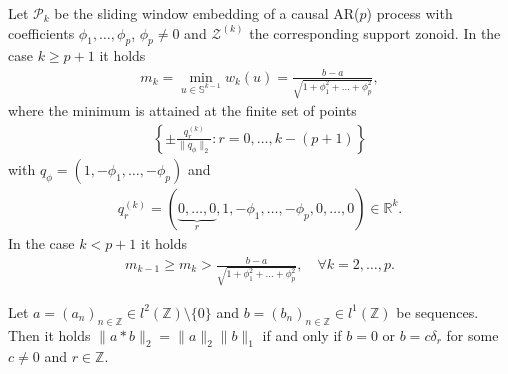 \begin{Prop}\label{prop:minimum_width}
    Let $\mathcal{P}_k$ be the sliding window embedding of a causal AR($p$) process with coefficients $\phi_1,\dots,\phi_p$, $\phi_p\ne0$ and $\mathcal{Z}^{(k)}$ the corresponding support zonoid. In the case $k\ge p+1$ it holds
    \begin{align*}
        m_k=\min_{u\in\mathbb{S}^{k-1}}w_k(u)=\frac{b-a}{\sqrt{1+\phi_1^2+\dots+\phi_p^2}},
    \end{align*}
    where the minimum is attained at the finite set of points
    \begin{align}\label{eq:minimizers}
        \left\{\pm\frac{q_r^{(k)}}{\|q_{\phi}\|_2}:r=0,\dots,k-(p+1)\right\}
    \end{align}
    with $q_{\phi}=(1,-\phi_1,\dots,-\phi_p)$ and
    \begin{align*}
        q_r^{(k)}=(\underbrace{0,\dots,0}_{r},1,-\phi_1,\dots,-\phi_p,0,\dots,0)\in\mathbb{R}^{k}.
    \end{align*}
    In the case $k<p+1$ it holds
    \begin{align*}
        m_{k-1}\ge m_k>\frac{b-a}{\sqrt{1+\phi_1^2+\dots+\phi_p^2}},\quad\forall k=2,\dots,p.
    \end{align*}
\end{Prop}

\begin{Lem}\label{lem:young_convolution_equality}
    Let $a=(a_n)_{n\in\mathbb{Z}}\in l^2(\mathbb{Z})\setminus\{0\}$ and $b=(b_n)_{n\in\mathbb{Z}}\in l^1(\mathbb{Z})$ be sequences. Then it holds $\|a\ast b\|_2=\|a\|_2\|b\|_1$ if and only if $b=0$ or $b=c\delta_r$ for some $c\ne0$ and $r\in\mathbb{Z}$.
\end{Lem}

